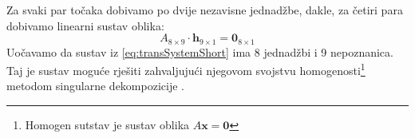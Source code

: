 
Za svaki par točaka dobivamo po dvije nezavisne jednadžbe, dakle, za četiri para dobivamo linearni sustav oblika:
\begin{equation}
\label{eq:transSystemShort}
A_{8\times9} \cdot \mathbf{h}_{9\times1} = \mathbf{0}_{8\times1}
\end{equation}
Uočavamo da sustav iz \eqref{eq:transSystemShort} ima 8 jednadžbi i 9 nepoznanica. Taj je sustav moguće rješiti zahvaljujući njegovom svojstvu homogenosti\footnote{Homogen sutstav je sustav oblika $A\mathbf{x} = \mathbf{0}$} metodom singularne dekompozicije .